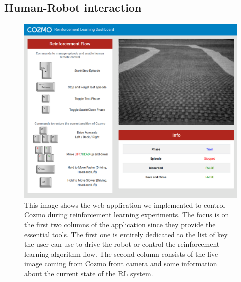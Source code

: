 \subsection{Human-Robot interaction} \label{subsec:human-robot-interaction}

\begin{figure}

    \centering
    \includegraphics[width=\textwidth]{img/dashboard.png}
    \caption[Web Application implemented to Control Cozmo]{This image shows the web application we implemented to control Cozmo during reinforcement learning experiments.
        The focus is on the first two columns of the application since they provide the essential tools.
        The first one is entirely dedicated to the list of key the user can use to drive the robot or control the reinforcement learning algorithm flow.
        The second column consists of the live image coming from Cozmo front camera and some information about the current state of the RL system.}
    \label{fig:dashboard}
\end{figure}

